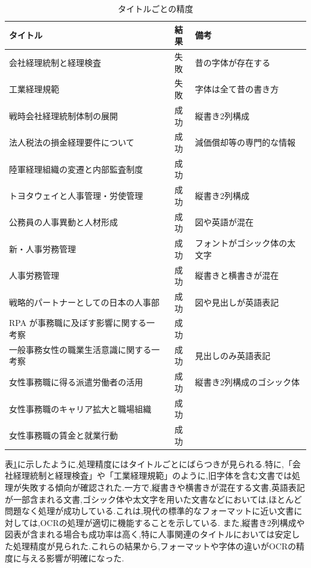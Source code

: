 \begin{table}[h]
  \centering
  \begin{tabular}{|l|c|l|}
    \hline
    \textbf{タイトル} & \textbf{結果} & \textbf{備考} \\ \hline
    会社経理統制と経理検査 & 失敗 & 昔の字体が存在する \\ \hline
    工業経理規範 & 失敗 & 字体は全て昔の書き方 \\ \hline
    戦時会社経理統制体制の展開 & 成功 & 縦書き2列構成 \\ \hline
    法人税法の損金経理要件について & 成功 & 減価償却等の専門的な情報 \\ \hline
    陸軍経理組織の変遷と内部監査制度 & 成功 & \\ \hline
    トヨタウェイと人事管理・労使管理 & 成功 & 縦書き2列構成 \\ \hline
    公務員の人事異動と人材形成 & 成功 & 図や英語が混在 \\ \hline
    新・人事労務管理 & 成功 & フォントがゴシック体の太文字 \\ \hline
    人事労務管理 & 成功 & 縦書きと横書きが混在 \\ \hline
    戦略的パートナーとしての日本の人事部 & 成功 & 図や見出しが英語表記 \\ \hline
    RPA が事務職に及ぼす影響に関する一考察 & 成功 & \\ \hline
    一般事務女性の職業生活意識に関する一考察 & 成功 & 見出しのみ英語表記 \\ \hline
    女性事務職に得る派遣労働者の活用 & 成功 & 縦書き2列構成のゴシック体 \\ \hline
    女性事務職のキャリア拡大と職場組織 & 成功 & \\ \hline
    女性事務職の賃金と就業行動 & 成功 & \\ \hline
  \end{tabular}
  \caption{タイトルごとの精度}
  \label{tab:title_accuracy}
\end{table}

表\ref{tab:title_accuracy}に示したように,処理精度にはタイトルごとにばらつきが見られる.特に,「会社経理統制と経理検査」や「工業経理規範」のように,旧字体を含む文書では処理が失敗する傾向が確認された.一方で,縦書きや横書きが混在する文書,英語表記が一部含まれる文書,ゴシック体や太文字を用いた文書などにおいては,ほとんど問題なく処理が成功している.これは,現代の標準的なフォーマットに近い文書に対しては,OCRの処理が適切に機能することを示している.
また,縦書き2列構成や図表が含まれる場合も成功率は高く,特に人事関連のタイトルにおいては安定した処理精度が見られた.これらの結果から,フォーマットや字体の違いがOCRの精度に与える影響が明確になった.

